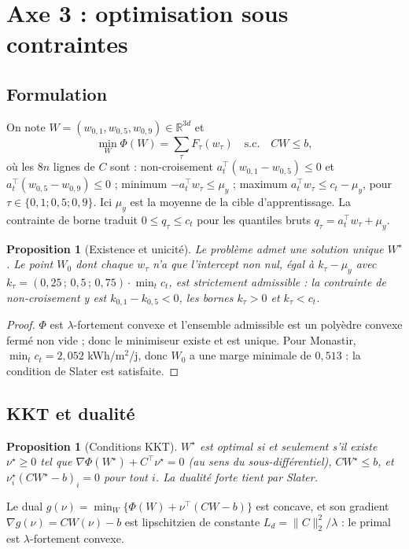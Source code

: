 \documentclass[11pt,a4paper]{article}
\newtheorem{proposition}[theorem]{Proposition}
\theoremstyle{remark}
\theoremstyle{definition}
\newcommand{\R}{\mathbb{R}}
\newcommand{\T}{^{\top}}
\begin{document}
\section{Axe 3 : optimisation sous contraintes}\label{sec:ax3}
\subsection{Formulation}
On note $W = (w_{0,1}, w_{0,5}, w_{0,9}) \in \R^{3d}$ et
\[
\min_W \Phi(W) = \sum_\tau F_\tau(w_\tau) \quad \text{s.c.}\quad CW \le b,
\]
où les $8n$ lignes de $C$ sont : non-croisement $a_t\T(w_{0,1} - w_{0,5}) \le 0$ et $a_t\T(w_{0,5} - w_{0,9}) \le 0$ ; minimum $-a_t\T w_\tau \le \mu_y$ ;
maximum $a_t\T w_\tau \le c_t - \mu_y$, pour $\tau \in \{0,1 ; 0,5 ; 0,9\}$. Ici $\mu_y$ est la moyenne de la cible d'apprentissage.
La contrainte de borne traduit $0 \le q_\tau \le c_t$ pour les quantiles bruts $q_\tau = a_t\T w_\tau + \mu_y$.

\begin{proposition}[Existence et unicité]
Le problème admet une solution unique $W^\star$. Le point $W_0$ dont chaque $w_\tau$ n'a que l'intercept non nul, égal à $k_\tau - \mu_y$ avec
$k_\tau = (0{,}25\,;\,0{,}5\,;\,0{,}75)\cdot\min_t c_t$, est strictement admissible : la contrainte de non-croisement y est $k_{0,1} - k_{0,5} < 0$, les bornes $k_\tau > 0$ et $k_\tau < c_t$.
\end{proposition}
\begin{proof}
$\Phi$ est $\lambda$-fortement convexe et l'ensemble admissible est un polyèdre convexe fermé non vide ; donc le minimiseur existe et est unique.
Pour Monastir, $\min_t c_t = 2{,}052$ kWh/m$^2$/j, donc $W_0$ a une marge minimale de $0{,}513$ : la condition de Slater est satisfaite.
\end{proof}

\subsection{KKT et dualité}
\begin{proposition}[Conditions KKT]
$W^\star$ est optimal si et seulement s'il existe $\nu^\star \ge 0$ tel que $\nabla\Phi(W^\star) + C\T\nu^\star = 0$ (au sens du sous-différentiel),
$CW^\star \le b$, et $\nu^\star_i (CW^\star - b)_i = 0$ pour tout $i$. La dualité forte tient par Slater.
\end{proposition}
Le dual $g(\nu) = \min_W\{\Phi(W) + \nu\T(CW-b)\}$ est concave, et son gradient $\nabla g(\nu) = CW(\nu) - b$ est lipschitzien de constante
$L_d = \|C\|_2^2/\lambda$ : le primal est $\lambda$-fortement convexe.
\end{document}
